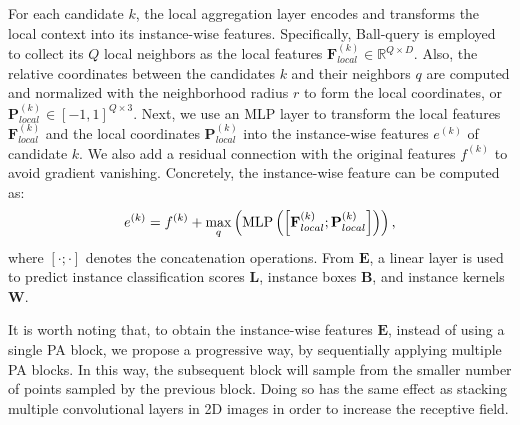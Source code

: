 \documentclass[10pt,twocolumn,letterpaper]{article}
\begin{document}
 For each candidate $k$, the local aggregation layer encodes and transforms the local context into its instance-wise features. 
Specifically, Ball-query is employed \cite{qi2018pointnet} to collect its $Q$ local neighbors as the local features $\mathbf{F}_{local}^{(k)} \in \mathbb{R}^{Q \times D}$. Also, the relative coordinates between the candidates $k$ and their neighbors $q$ are computed and normalized with the neighborhood radius $r$ to form the local coordinates, or $\mathbf{P}_{local}^{(k)} \in [-1, 1]^{Q \times 3}$.
% 
% 
% 
Next, we use an MLP layer to transform the local features $\mathbf{F}_{local}^{(k)}$ and the local coordinates $\mathbf{P}_{local}^{(k)}$ into the instance-wise features $e^{(k)}$ of candidate $k$. We also add a residual connection with the original features $f^{(k)}$ to avoid gradient vanishing. Concretely, the instance-wise feature can be computed as:
\begin{equation}
    \vspace{-4pt}
    e^{(k)} = f^{(k)} + \max_q \left ( \text{MLP}\left ( \left[\mathbf{F}_{local}^{(k)}; \mathbf{P}_{local}^{(k)} \right]\right ) \right ),
\end{equation}
%
where $\left[\cdot ; \cdot\right]$ denotes the concatenation operations. From $\mathbf{E}$, a linear layer is used to predict instance classification scores $\mathbf{L}$, instance boxes $\mathbf{B}$, and instance kernels $\mathbf{W}$.

It is worth noting that, to obtain the instance-wise features $\mathbf{E}$, instead of using a single PA block, we propose a progressive way, by sequentially applying multiple PA blocks. In this way, the subsequent block will sample from the smaller number of points sampled by the previous block. Doing so has the same effect as stacking multiple convolutional layers in 2D images in order to increase the receptive field. 
%
\end{document}

